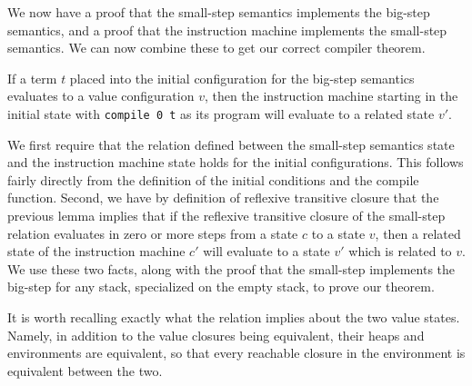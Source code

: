 We now have a proof that the small-step semantics implements the big-step
semantics, and a proof that the instruction machine implements the small-step
semantics. We can now combine these to get our correct compiler theorem. 

\begin{theorem} 
\label{thm:correctness}
If a term $t$ placed into the initial configuration for the big-step semantics
evaluates to a value configuration $v$, then the instruction machine starting
in the initial state with \texttt{compile 0 t} as its program will evaluate to a
related state $v'$.  
\end{theorem}
\begin{proofoutline}
We first require that the relation defined between the small-step semantics
state and the instruction machine state holds for the initial configurations.
This follows fairly directly from the definition of the initial conditions and
the compile function. Second, we have by definition of reflexive transitive
closure that the previous lemma implies that if the reflexive transitive
closure of the small-step relation evaluates in zero or more steps from a
state $c$ to a state $v$, then a related state of the instruction machine $c'$
will evaluate to a state $v'$ which is related to $v$. We use these two facts,
along with the proof that the small-step implements the big-step for any stack,
specialized on the empty stack, to prove our theorem. 
\end{proofoutline}

It is worth recalling exactly what the relation implies about the two value
states. Namely, in addition to the value closures being equivalent, their heaps
and environments are equivalent, so that every reachable closure in the
environment is equivalent between the two.


